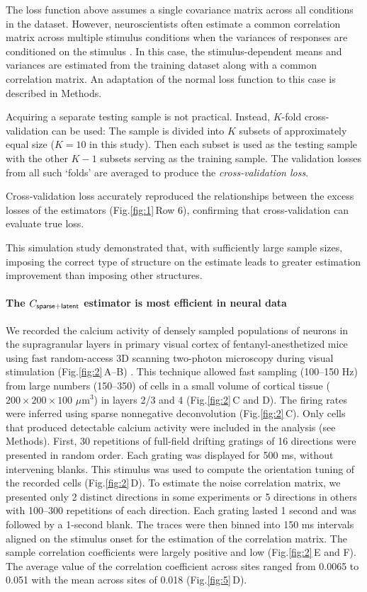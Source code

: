 \documentclass[10pt]{article}
\newcommand{\sq}[1]{\lq#1\rq}
\newcommand{\figref}[2]{Fig.\;\ref{fig:#1}\,#2}
\begin{document}
The loss function above assumes a single covariance matrix across all conditions in the dataset.  However, neuroscientists often estimate a common correlation matrix across multiple stimulus conditions when the variances of responses are conditioned on the stimulus \cite{Vogels:1989, Ponce:2013}. In this case, the stimulus-dependent means and variances are estimated from the training dataset along with a common correlation matrix. An adaptation of the normal loss function to this case is described in Methods.

Acquiring a separate testing sample is not practical. Instead, $K$-fold cross-validation can be used: The sample is divided into $K$ subsets of approximately equal size ($K=10$ in this study).  Then each subset is used as the testing sample with the other $K-1$ subsets serving as the training sample. The validation losses from all such \sq{folds} are averaged to produce the \emph{cross-validation loss}.  

Cross-validation loss accurately reproduced the relationships between the excess losses of the estimators (\figref{1}{Row 6}), confirming that cross-validation can evaluate true loss.

This simulation study demonstrated that, with sufficiently large sample sizes, imposing the correct type of structure on the estimate leads to greater estimation improvement than imposing other structures.

\paragraph{The $C_{\sf sparse+latent}$ estimator is most efficient in neural data}
We recorded the calcium activity of densely sampled populations of neurons in the supragranular layers in primary visual cortex of fentanyl-anesthetized mice using fast random-access 3D scanning two-photon microscopy during visual stimulation (\figref{2}{A--B}) \cite{Reddy:2005, Katona:2012, Cotton:2013}. This technique allowed fast sampling (100--150 Hz) from large numbers (150--350) of cells in a small volume of cortical tissue ($200\times200\times100$ $\mu$m$^3$) in layers 2/3 and 4 (\figref{2}{C and D}).  The firing rates were inferred using sparse nonnegative deconvolution \cite{Vogelstein:2010} (\figref{2}{C}). Only cells that produced detectable calcium activity were included in the analysis (see Methods).  First, 30 repetitions of full-field drifting gratings of 16 directions were presented in random order.  Each grating was displayed for 500 ms, without intervening blanks.  This stimulus was used to compute the orientation tuning of the recorded cells (\figref{2}{D}). To estimate the noise correlation matrix, we presented only 2 distinct directions in some experiments or 5 directions in others with 100--300 repetitions of each direction. Each grating lasted 1 second and was followed by a 1-second blank.  The traces were then binned into 150 ms intervals aligned on the stimulus onset for the estimation of the correlation matrix.   The sample correlation coefficients were largely positive and low (\figref{2}{E and F}). The average value of the correlation coefficient across sites ranged from 0.0065 to 0.051 with the mean across sites of 0.018 (\figref{5}{D}).  
\end{document}
